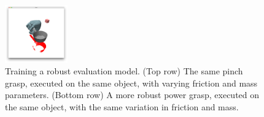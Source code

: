 \begin{figure}[t]
\includegraphics[width=0.24\textwidth]{images/Pan4_LFHW}
\caption{Training a robust evaluation model. (Top row) The same pinch grasp, executed on the same object, with varying friction and mass parameters. (Bottom row) A more robust power grasp, executed on the same object, with the same variation in friction and mass. \label{fig:evaluative-training}}
\end{figure}
